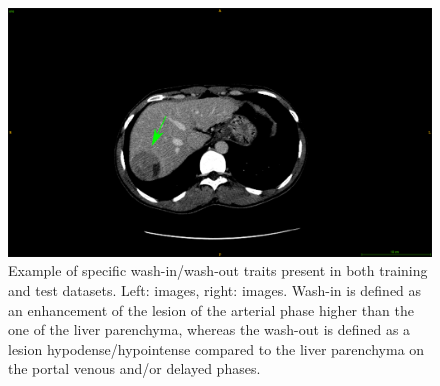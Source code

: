 \begin{figure}[!ht]
\begin{minipage}{0.45\linewidth}
	\end{minipage} \hspace{-0.1cm}
	\begin{minipage}{0.45\linewidth}
		\includegraphics[width=\linewidth]{../Contributions/images/ImagingTraits/ResizeTCIA_washout}
	\end{minipage}
	\caption{Example of specific wash-in/wash-out traits present in both training and test datasets. Left: \textbf{} images, right: \textbf{} images.
	Wash-in is defined as an enhancement of the lesion of the arterial phase higher than the one of the liver parenchyma, whereas the wash-out is defined as a lesion hypodense/hypointense compared to the liver parenchyma on the portal venous and/or delayed phases.}
	\label{fig:InterDb_imagingTraits3}
\end{figure}


